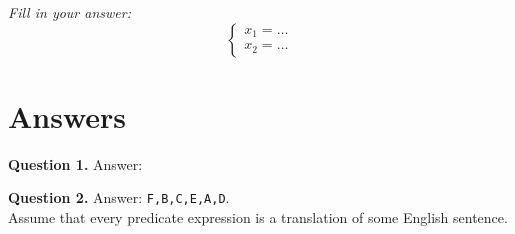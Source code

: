 \documentclass[jou]{apa6}
\begin{document}
{\em Fill in your answer:}
$$\left\{ \begin{array}{l}
x_1 = \ldots\\
x_2 = \ldots
\end{array} \right.$$





\newpage 

\section{Answers}


{\bf Question 1.} Answer: 

\vspace{10pt}
{\bf Question 2.} Answer: {\tt F,B,C,E,A,D}.\\
Assume that every predicate expression is a translation of some English sentence. 
\end{document}
